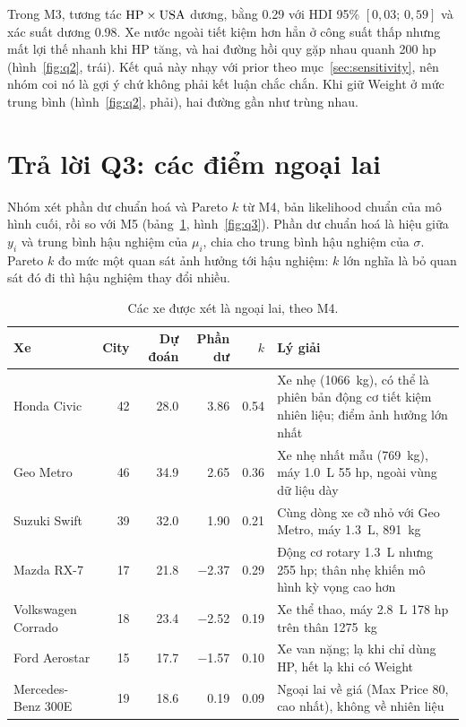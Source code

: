 \documentclass[12pt,a4paper]{report}
\begin{document}
Trong M3, tương tác $\mathrm{HP} \times \mathrm{USA}$ dương, bằng \num{0.29} với HDI 95\%
$[0{,}03;\, 0{,}59]$ và xác suất dương \num{0.98}. Xe nước ngoài tiết kiệm hơn
hẳn ở công suất thấp nhưng mất lợi thế nhanh khi HP tăng, và hai đường hồi quy
gặp nhau quanh 200 hp (hình~\ref{fig:q2}, trái). Kết quả này nhạy với prior
theo mục~\ref{sec:sensitivity}, nên nhóm coi nó là gợi ý chứ không phải kết luận
chắc chắn. Khi giữ Weight ở mức trung bình (hình~\ref{fig:q2}, phải), hai đường
gần như trùng nhau.


\section{Trả lời Q3: các điểm ngoại lai}
\label{sec:q3}

Nhóm xét phần dư chuẩn hoá và Pareto $k$ từ M4, bản likelihood chuẩn của mô
hình cuối, rồi so với M5 (bảng~\ref{tab:outliers}, hình~\ref{fig:q3}). Phần dư
chuẩn hoá là hiệu giữa $y_i$ và trung bình hậu nghiệm của $\mu_i$, chia cho
trung bình hậu nghiệm của $\sigma$. Pareto $k$ đo mức một quan sát ảnh hưởng tới
hậu nghiệm: $k$ lớn nghĩa là bỏ quan sát đó đi thì hậu nghiệm thay đổi nhiều.

\begin{table}[tp]
  \centering
  \small
  \caption{Các xe được xét là ngoại lai, theo M4.}
  \label{tab:outliers}
  \begin{tabular}{lrrrr>{\raggedright\arraybackslash}p{6.4cm}}
    \toprule
    Xe & City & Dự đoán & Phần dư & $k$ & Lý giải \\
    \midrule
    Honda Civic        & 42 & \num{28.0} & \num{3.86}  & \num{0.54}
      & Xe nhẹ (\SI{1066}{kg}), có thể là phiên bản động cơ tiết kiệm nhiên liệu; điểm ảnh hưởng lớn nhất \\
    Geo Metro          & 46 & \num{34.9} & \num{2.65}  & \num{0.36}
      & Xe nhẹ nhất mẫu (\SI{769}{kg}), máy \SI{1.0}{L} 55 hp, ngoài vùng dữ liệu dày \\
    Suzuki Swift       & 39 & \num{32.0} & \num{1.90}  & \num{0.21}
      & Cùng dòng xe cỡ nhỏ với Geo Metro, máy \SI{1.3}{L}, \SI{891}{kg} \\
    Mazda RX-7         & 17 & \num{21.8} & \num{-2.37} & \num{0.29}
      & Động cơ rotary \SI{1.3}{L} nhưng 255 hp; thân nhẹ khiến mô hình kỳ vọng cao hơn \\
    Volkswagen Corrado & 18 & \num{23.4} & \num{-2.52} & \num{0.19}
      & Xe thể thao, máy \SI{2.8}{L} 178 hp trên thân \SI{1275}{kg} \\
    Ford Aerostar      & 15 & \num{17.7} & \num{-1.57} & \num{0.10}
      & Xe van nặng; lạ khi chỉ dùng HP, hết lạ khi có Weight \\
    Mercedes-Benz 300E & 19 & \num{18.6} & \num{0.19}  & \num{0.09}
      & Ngoại lai về giá (Max Price 80, cao nhất), không về nhiên liệu \\
    \bottomrule
  \end{tabular}
\end{table}
\end{document}
